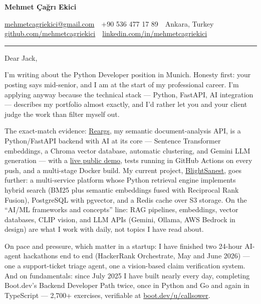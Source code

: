 \documentclass[11pt,a4paper]{article}
\begin{document}
{\LARGE\bfseries\color{accent} Mehmet Çağrı Ekici}\par
\vspace{2pt}
{\small
\href{mailto:mehmetcagriekici@gmail.com}{mehmetcagriekici@gmail.com} \,\textbullet\,
+90 536 477 17 89 \,\textbullet\,
Ankara, Turkey \,\textbullet\,
\href{https://github.com/mehmetcagriekici}{github.com/mehmetcagriekici} \,\textbullet\,
\href{https://linkedin.com/in/mehmetcagriekici}{linkedin.com/in/mehmetcagriekici}
}

\vspace{10pt}
\hrule
\vspace{14pt}

Dear Jack,

I'm writing about the Python Developer position in Munich. Honesty first: your posting says mid-senior, and I am at the start of my professional career. I'm applying anyway because the technical stack --- Python, FastAPI, AI integration --- describes my portfolio almost exactly, and I'd rather let you and your client judge the work than filter myself out.

The exact-match evidence: \href{https://github.com/mehmetcagriekici/reargs}{Reargs}, my semantic document-analysis API, is a Python/FastAPI backend with AI at its core --- Sentence Transformer embeddings, a Chroma vector database, automatic clustering, and Gemini LLM generation --- with a \href{https://huggingface.co/spaces/mhmtcgrkc/reargs}{live public demo}, tests running in GitHub Actions on every push, and a multi-stage Docker build. My current project, \href{https://github.com/mehmetcagriekici/blightsanest_stable_insights}{BlightSanest}, goes further: a multi-service platform whose Python retrieval engine implements hybrid search (BM25 plus semantic embeddings fused with Reciprocal Rank Fusion), PostgreSQL with pgvector, and a Redis cache over S3 storage. On the ``AI/ML frameworks and concepts'' line: RAG pipelines, embeddings, vector databases, CLIP vision, and LLM APIs (Gemini, Ollama, AWS Bedrock in design) are what I work with daily, not topics I have read about.

On pace and pressure, which matter in a startup: I have finished two 24-hour AI-agent hackathons end to end (HackerRank Orchestrate, May and June 2026) --- one a support-ticket triage agent, one a vision-based claim verification system. And on fundamentals: since July 2025 I have built nearly every day, completing Boot.dev's Backend Developer Path twice, once in Python and Go and again in TypeScript --- 2,700+ exercises, verifiable at \href{https://www.boot.dev/u/callsower}{boot.dev/u/callsower}.
\end{document}
